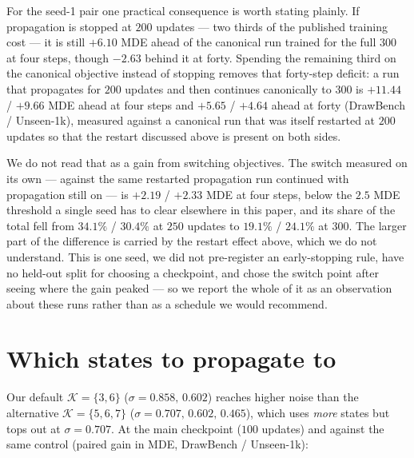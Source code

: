 For the seed-1 pair one practical consequence is worth stating plainly. If propagation is stopped at $200$
updates --- two thirds of the published training cost --- it is still $+6.10$ MDE ahead of
the canonical run trained for the full $300$ at four steps, though $-2.63$ behind it at
forty. Spending the remaining third on the canonical objective instead of stopping removes
that forty-step deficit: a run that propagates for $200$ updates and then continues
canonically to $300$ is $+11.44$ / $+9.66$ MDE ahead at four steps and $+5.65$ / $+4.64$ ahead
at forty (DrawBench / Unseen-1k), measured against a canonical run that was itself restarted at
$200$ updates so that the restart discussed above is present on both sides.

We do not read that as a gain from switching objectives. The switch measured on its own ---
against the same restarted propagation run continued with propagation still on --- is $+2.19$
/ $+2.33$ MDE at four steps, below the $2.5$ MDE threshold a single seed has to clear
elsewhere in this paper, and its share of the total fell from $34.1\%$ / $30.4\%$ at $250$
updates to $19.1\%$ / $24.1\%$ at $300$. The larger part of the difference is carried by the
restart effect above, which we do not understand. This is one seed, we did not pre-register an
early-stopping rule, have no held-out split for choosing a checkpoint, and chose the switch
point after seeing where the gain peaked --- so we report the whole of it as an observation
about these runs rather than as a schedule we would recommend.

\section{Which states to propagate to}
\label{app:family}

Our default $\mathcal K=\{3,6\}$ ($\sigma=0.858,\,0.602$) reaches higher noise than the
alternative $\mathcal K=\{5,6,7\}$ ($\sigma=0.707,\,0.602,\,0.465$), which uses \emph{more}
states but tops out at $\sigma=0.707$. At the main checkpoint ($100$ updates) and against
the same control (paired gain in MDE, DrawBench / Unseen-1k):

\begin{center}
\end{center}

